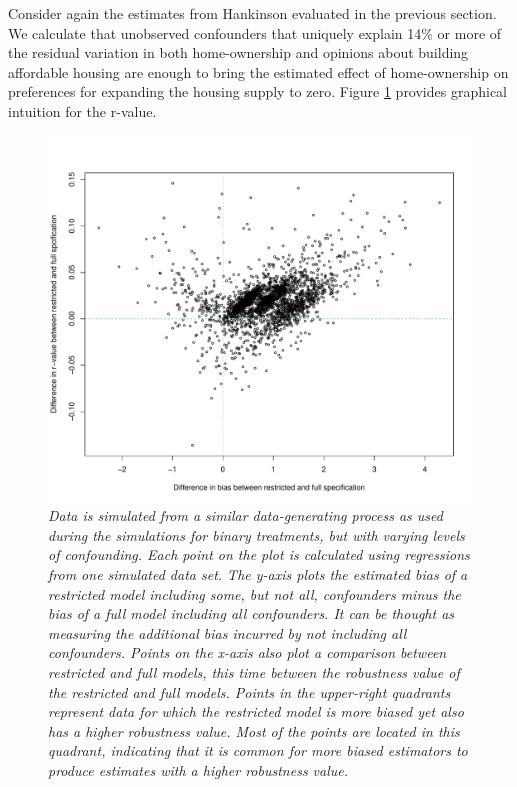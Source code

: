 \documentclass[hidelinks,11pt]{article}
\begin{document}
\begin{figure}
  \label{hankinson3}
\end{figure}



Consider again the estimates from Hankinson evaluated in the previous section. We calculate that unobserved confounders that uniquely explain 14\% or more of the residual variation in both home-ownership and opinions about building affordable housing are enough to bring the estimated effect of home-ownership on preferences for expanding the housing supply to zero. Figure \ref{hankinson3} provides graphical intuition for the r-value.

\begin{figure}
  \includegraphics[width=\linewidth]{../plots/cov_prob.pdf}
  \caption{\emph{Data is simulated from a similar data-generating process as used during the simulations for binary treatments, but with varying levels of confounding. Each point on the plot is calculated using regressions from one simulated data set. The y-axis plots the estimated bias of a restricted model including some, but not all, confounders minus the bias of a full model including all confounders. It can be thought as measuring the additional bias incurred by not including all confounders. Points on the x-axis also plot a comparison between restricted and full models, this time between the robustness value of the restricted and full models. Points in the upper-right quadrants represent data for which the restricted model is more biased yet also has a higher robustness value. Most of the points are located in this quadrant, indicating that it is common for more biased estimators to produce estimates with a higher robustness value.}}
  \label{cov_prob}
\end{figure}
\end{document}
